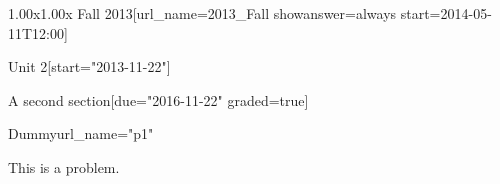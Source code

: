 \documentclass[12pt]{article}
\begin{document}
\begin{edXcourse}{1.00x}{1.00x Fall 2013}[url_name=2013_Fall showanswer=always start=2014-05-11T12:00]
\begin{edXchapter}{Unit 2}[start="2013-11-22"]
\begin{edXsection}{A second section}[due="2016-11-22" graded=true]

\begin{edXproblem}{Dummy}{url_name="p1"}
 
This is a problem.

\edXincludepy{}

\end{edXproblem}



\end{edXsection}
\end{edXchapter}
\end{edXcourse}

\end{document}
